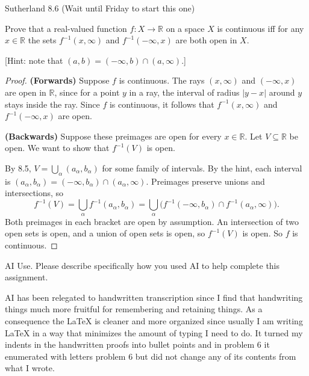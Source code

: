 \documentclass[minion]{homework}
\newcommand{\Reals}{\ensuremath{\mathbb R}}%
\begin{document}
\begin{problems}
\problem Sutherland 8.6 (Wait until Friday to start this one)

Prove that a real-valued function $f : X \to \Reals$ on a space $X$ is continuous iff for any $x \in \Reals$ the sets $f^{-1}(x, \infty)$ and $f^{-1}(-\infty, x)$ are both open in $X$.

[Hint: note that $(a, b) = (-\infty, b) \cap (a, \infty)$.]

\begin{proof}
\textbf{(Forwards)} Suppose $f$ is continuous. The rays $(x, \infty)$ and $(-\infty, x)$ are open in $\Reals$, since for a point $y$ in a ray, the interval of radius $|y - x|$ around $y$ stays inside the ray. Since $f$ is continuous, it follows that $f^{-1}(x, \infty)$ and $f^{-1}(-\infty, x)$ are open.

\textbf{(Backwards)} Suppose these preimages are open for every $x \in \Reals$. Let $V \subseteq \Reals$ be open. We want to show that $f^{-1}(V)$ is open.

By 8.5, $V = \bigcup_\alpha (a_\alpha, b_\alpha)$ for some family of intervals. By the hint, each interval is $(a_\alpha, b_\alpha) = (-\infty, b_\alpha) \cap (a_\alpha, \infty)$. Preimages preserve unions and intersections, so
\[
f^{-1}(V) = \bigcup_\alpha f^{-1}(a_\alpha, b_\alpha)
= \bigcup_\alpha \Big( f^{-1}(-\infty, b_\alpha) \cap f^{-1}(a_\alpha, \infty) \Big).
\]
Both preimages in each bracket are open by assumption. An intersection of two open sets is open, and a union of open sets is open, so $f^{-1}(V)$ is open. So $f$ is continuous.
\end{proof}

\problem AI Use. Please describe specifically how you used AI to help complete this assignment.

AI has been relegated to handwritten transcription since I find that handwriting things much more fruitful for remembering and retaining things. As a consequence the LaTeX is cleaner and more organized since usually I am writing LaTeX in a way that minimizes the amount of typing I need to do. It turned my indents in the handwritten proofs into bullet points and in problem 6 it enumerated with letters problem 6 but did not change any of its contents from what I wrote. 
\end{problems}
\end{document}
